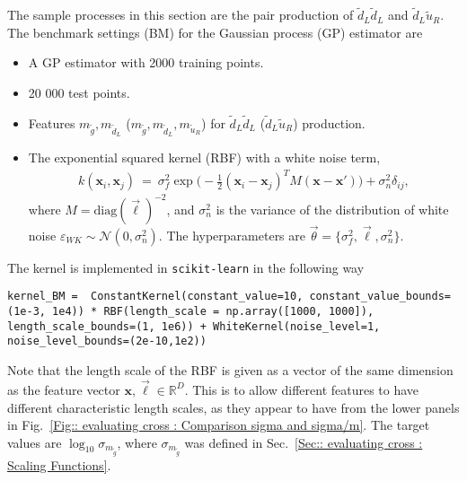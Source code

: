 \documentclass[twoside,english]{uiofysmaster}
\begin{document}
{{The sample processes in this section are the pair production of $\widetilde{d}_L \widetilde{d}_L$ and $\widetilde{d}_L \widetilde{u}_R$. The benchmark settings (BM) for the Gaussian process (GP) estimator are 
\begin{itemize}
\item A GP estimator with 2000 training points.
\item 20 000 test points.
\item Features $m_{\widetilde{g}}, m_{\widetilde{d}_L}$ ($m_{\widetilde{g}}, m_{\widetilde{d}_L}, m_{\widetilde{u}_R}$) for $\widetilde{d}_L \widetilde{d}_L$ ($\widetilde{d}_L \widetilde{u}_R$) production.
\item The exponential squared kernel (RBF) with a white noise term, 
\begin{align}
k(\textbf{x}_i, \textbf{x}_j)~=~\sigma_f^2 \exp \big(-\frac{1}{2} (\textbf{x}_i-\textbf{x}_j)^TM(\textbf{x} - \textbf{x}') \big) + \sigma_n^2 \delta_{ij},
\end{align}
where $M = \textrm{diag}(\vec{\ell})^{-2}$, and $\sigma_n^2$ is the variance of the distribution of white noise $\varepsilon_{WK} \sim \mathcal{N}(0, \sigma_n^2)$. The hyperparameters are $\vec{\theta} = \{ \sigma^2_f, \vec{\ell}, \sigma_n^2\}.$
\end{itemize}
The kernel is implemented in \verb|scikit-learn| in the following way 
\begin{lstlisting}
kernel_BM =  ConstantKernel(constant_value=10, constant_value_bounds=(1e-3, 1e4)) * RBF(length_scale = np.array([1000, 1000]), length_scale_bounds=(1, 1e6)) + WhiteKernel(noise_level=1, noise_level_bounds=(2e-10,1e2))
\end{lstlisting} 
Note that the length scale of the RBF is given as a vector of the same dimension as the feature vector $\textbf{x},\vec{\ell} \in \mathbb{R}^D$. This is to allow different features to have different characteristic length scales, as they appear to have from the lower panels in Fig.~\ref{Fig:: evaluating cross : Comparison sigma and sigma/m}. The target values are $\log_{10} \sigma_{m_{\widetilde{g}}}$, where $\sigma_{m_{\widetilde{g}}}$ was defined in Sec.~\ref{Sec:: evaluating cross : Scaling Functions}.

}}
\end{document}
